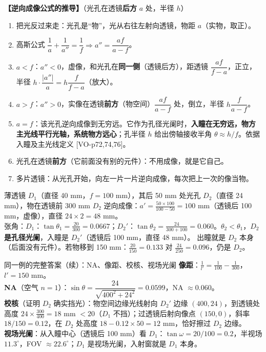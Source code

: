 \textbf{【逆向成像公式的推导】}（光孔在透镜\textbf{后方} $a$ 处，半径 $h$）
\begin{enumerate}
\item 把光反过来走：光孔是“物”，光从右往左射向透镜，物距 $a$（实物，取正）。
\item 高斯公式 $\dfrac1a+\dfrac1{a''}=\dfrac1f\Rightarrow a''=\dfrac{af}{a-f}$。
\item $a<f$：$a''<0$，虚像，和光孔在\textbf{同一侧}（透镜后方），距透镜 $\dfrac{af}{f-a}$，正立，半径 $h\cdot\dfrac{|a''|}{a}=h\dfrac{f}{f-a}$（放大）。
\item $a>f$：$a''>0$，实像在透镜\textbf{前方}（物空间）$\dfrac{af}{a-f}$ 处，倒立，半径 $h\dfrac{f}{a-f}$。
\item $a=f$：该光孔逆向成像到无穷远。它作为孔径光阑时，\textbf{入瞳在无穷远，物方主光线平行光轴，系统物方远心}；孔半径 $h$ 给出傍轴接收半角 $\theta\approx h/f$。依据入瞳及主光线定义 [VO-p72,74,76]。
\item 光孔在透镜\textbf{前方}（它前面没有别的元件）：不用成像，就是它自己。
\item 多片透镜：从光孔开始，向左一片一片逆向成像，每次把上一次的像当物。
\end{enumerate}

\begin{exam}{薄透镜 $D_1$（直径 40 mm，$f=100$ mm），其后 50 mm 处光孔 $D_2$（直径 24 mm），物在透镜前 300 mm}
$D_2$ 逆向成像：$a'=\frac{50\times100}{100-50}=100$ mm（透镜后 100 mm，虚像），直径 $24\times2=48$ mm。\\
张角：$D_1$：$\tan\theta_1=\frac{20}{300}=0.0667$；$D_2'$：$\tan\theta_2=\frac{24}{300+100}=0.060$。$\theta_2<\theta_1$，\textbf{$D_2$ 是孔径光阑}，入瞳是 $D_2'$（透镜后 100 mm，直径 48 mm）。
出瞳就是 $D_2$ 本身（后面没有元件）。若物移到 150 mm：$\frac{20}{150}=0.133$ 对 $\frac{24}{250}=0.096$，仍是 $D_2$。
\end{exam}

\begin{exam}{同一例的完整答案（续）：NA、像距、校核、视场光阑}
\textbf{像距}：$\frac1{l'}=\frac1{100}-\frac1{300}$，$l'=150$ mm。\\
\textbf{NA}（空气 $n=1$）：$\sin\theta=\dfrac{24}{\sqrt{400^2+24^2}}=0.0599$，NA $\approx0.060$。\\
\textbf{校核}（证明 $D_2$ 确实挡光）：物空间边缘光线射向 $D_2'$ 边缘 $(400,24)$，到透镜处高度 $24\times\frac{300}{400}=18$ mm $<20$（$D_1$ 不挡）；过透镜后射向像点 $(150,0)$，斜率 $18/150=0.12$，在 $D_2$ 处高度 $18-0.12\times50=12$ mm，恰好擦过 $D_2$ 边缘。\\
\textbf{视场光阑}：从入瞳中心（透镜后 100 mm）看 $D_1$：$\tan\omega=20/100=0.2$，半视场 $11.3^\circ$，FOV $\approx22.6^\circ$；$D_1$ 是视场光阑，入射窗就是 $D_1$ 本身。
\end{exam}

